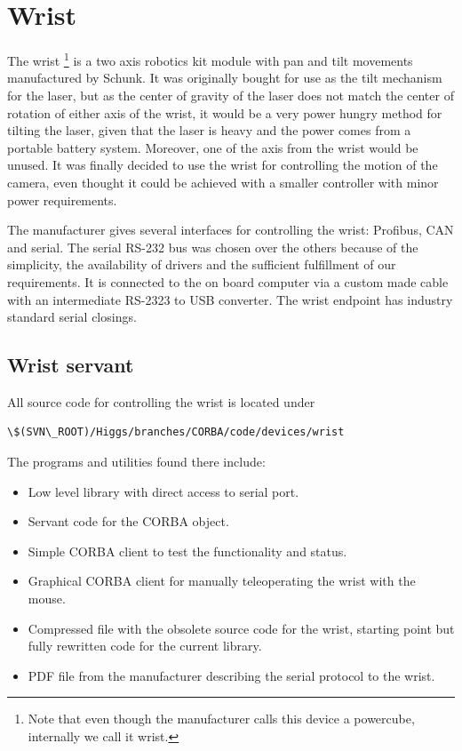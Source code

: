 \section{Wrist}
\label{sec:devmanual_wrist}
The wrist \footnote{Note that even though the manufacturer calls this device
a powercube, internally we call it wrist.} is a two axis robotics kit module with pan and tilt
movements manufactured by Schunk\textregistered{}. It was
originally bought for use as the tilt mechanism for the laser, but as the center of gravity of
the laser does not match the center of rotation of either axis of the wrist, it
would be a very power hungry method for tilting the laser, given that the laser
is heavy and the power comes from a portable battery system. Moreover, one of
the axis from the wrist would be unused. It was finally decided to use the wrist
for controlling the motion of the camera, even thought it could be achieved with
a smaller controller with minor power requirements.

The manufacturer gives several interfaces for controlling the wrist: Profibus,
CAN and serial. The serial RS-232 bus was chosen over the others because of the
simplicity, the availability of drivers and the sufficient fulfillment of our
requirements. It is connected to the on board computer via a custom made
cable with an intermediate RS-2323 to USB converter. The wrist endpoint
has industry standard serial closings.
\subsection{Wrist servant}
All source code for controlling the wrist is located under
\begin{verbatim}
\$(SVN\_ROOT)/Higgs/branches/CORBA/code/devices/wrist
\end{verbatim} The programs and utilities found there include:
\begin{itemize}
\item Low level library with direct access to serial port.
\item Servant code for the CORBA object.
\item Simple CORBA client to test the functionality and status.
\item Graphical CORBA client for manually teleoperating the wrist with the mouse.
\item Compressed file with the obsolete source code for the wrist, starting
  point but fully rewritten code for the current library.
\item PDF file from the manufacturer describing the serial protocol to the wrist.
\end{itemize}

